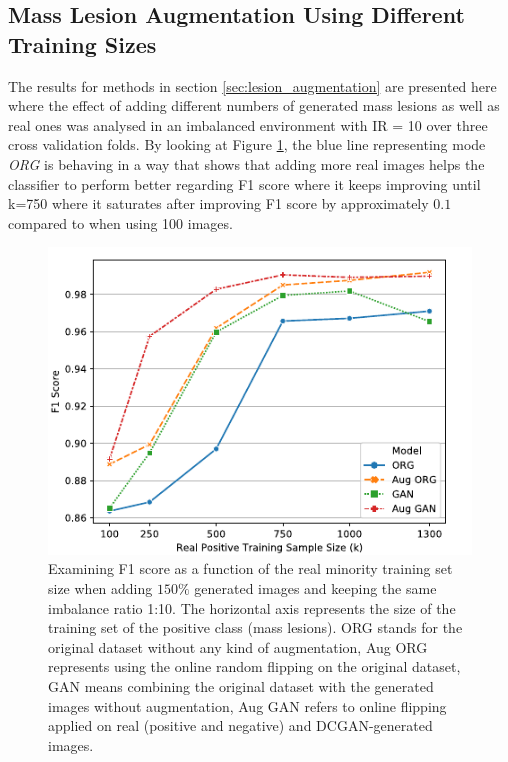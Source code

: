\documentclass[final,3p,twocolumn,authoryear,sort&compress,times]{maia}
\begin{document}
\subsection{Mass Lesion Augmentation Using Different Training Sizes}
The results for methods in section \ref{sec:lesion_augmentation} are presented here where the effect of adding different numbers of generated mass lesions as well as real ones was analysed in an imbalanced environment with IR = 10 over three cross validation folds. By looking at Figure \ref{fig:F1Score_augmentation}, the blue line representing mode \textit{ORG} is behaving in a way that shows that adding more real images helps the classifier to perform better regarding F1 score where it keeps improving until k=750 where it saturates after improving F1 score by approximately $0.1$ compared to when using 100 images.
\begin{figure}
    \centering
    \includegraphics{figures/F1Score_allfolds.pdf}
    \caption{Examining F1 score as a function of the real minority training set size when adding $150\%$ generated images and keeping the same imbalance ratio 1:10. The horizontal axis represents the size of the training set of the positive class (mass lesions). ORG stands for the original dataset without any kind of augmentation, Aug ORG represents using the online random flipping on the original dataset, GAN means combining the original dataset with the generated images without augmentation, Aug GAN refers to online flipping applied on real (positive and negative) and DCGAN-generated images.}
    \label{fig:F1Score_augmentation}
\end{figure}


\end{document}
